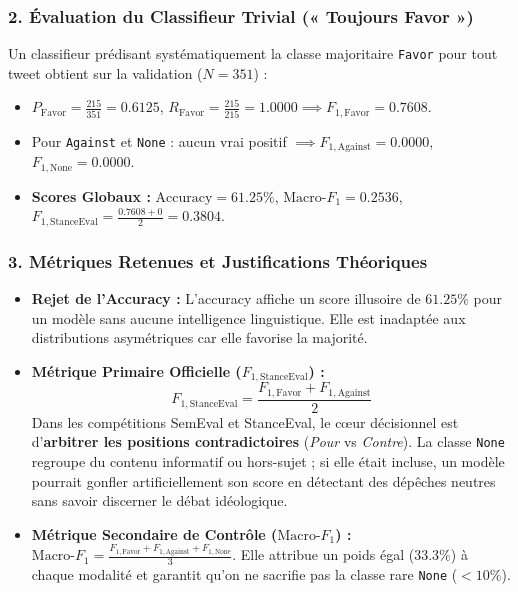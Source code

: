\documentclass[11pt,a4paper]{article}
\begin{document}
\subsubsection*{2. Évaluation du Classifieur Trivial (« Toujours Favor »)}
Un classifieur prédisant systématiquement la classe majoritaire \texttt{Favor} pour tout tweet obtient sur la validation ($N=351$) :
\begin{itemize}[noitemsep]
    \item $P_{\text{Favor}} = \frac{215}{351} = 0.6125$, \quad $R_{\text{Favor}} = \frac{215}{215} = 1.0000 \implies F_{1,\text{Favor}} = \mathbf{0.7608}$.
    \item Pour \texttt{Against} et \texttt{None} : aucun vrai positif $\implies F_{1,\text{Against}} = \mathbf{0.0000}$, \quad $F_{1,\text{None}} = \mathbf{0.0000}$.
    \item \textbf{Scores Globaux :} $\text{Accuracy} = \mathbf{61.25\%}$, \quad $\text{Macro-}F_1 = \mathbf{0.2536}$, \quad $F_{1,\text{StanceEval}} = \frac{0.7608 + 0}{2} = \mathbf{0.3804}$.
\end{itemize}

\subsubsection*{3. Métriques Retenues et Justifications Théoriques}
\begin{itemize}[leftmargin=*]
    \item \textbf{Rejet de l'Accuracy :} L'accuracy affiche un score illusoire de $61.25\%$ pour un modèle sans aucune intelligence linguistique. Elle est inadaptée aux distributions asymétriques car elle favorise la majorité.
    \item \textbf{Métrique Primaire Officielle ($F_{1,\text{StanceEval}}$) :}
    \begin{equation}
        F_{1,\text{StanceEval}} = \frac{F_{1,\text{Favor}} + F_{1,\text{Against}}}{2}
    \end{equation}
    Dans les compétitions SemEval et StanceEval, le cœur décisionnel est d'\textbf{arbitrer les positions contradictoires} (\textit{Pour} vs \textit{Contre}). La classe \texttt{None} regroupe du contenu informatif ou hors-sujet ; si elle était incluse, un modèle pourrait gonfler artificiellement son score en détectant des dépêches neutres sans savoir discerner le débat idéologique.
    \item \textbf{Métrique Secondaire de Contrôle ($\text{Macro-}F_1$) :} 
    $\text{Macro-}F_1 = \frac{F_{1,\text{Favor}} + F_{1,\text{Against}} + F_{1,\text{None}}}{3}$. Elle attribue un poids égal ($33.3\%$) à chaque modalité et garantit qu'on ne sacrifie pas la classe rare \texttt{None} ($<10\%$).
\end{itemize}
\end{document}
